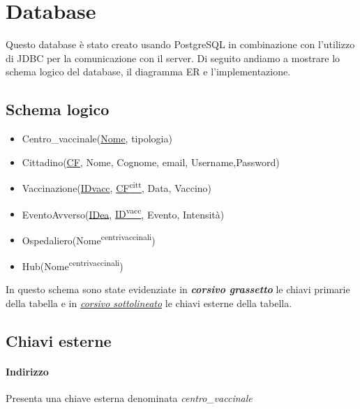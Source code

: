 \section{Database}

	Questo database è stato creato usando PostgreSQL in combinazione con l’utilizzo di JDBC per la comunicazione con il server.
	Di seguito andiamo a mostrare lo schema logico del database, il diagramma ER e l’implementazione.
	
\subsection{Schema logico}

	\begin{itemize}
		\item Centro\_vaccinale(\underline{Nome}, tipologia)
		
		\item Cittadino(\underline{CF}, Nome, Cognome, email, Username,Password)
		
		\item Vaccinazione(\underline{IDvacc}, \underline{CF\textsuperscript{citt}}, Data, Vaccino)
		
		\item EventoAvverso(\underline{IDea}, \underline{ID\textsuperscript{vacc}}, Evento, Intensità)
		
		\item Ospedaliero(Nome\textsuperscript{centrivaccinali})
		
		\item Hub(Nome\textsuperscript{centrivaccinali})
	\end{itemize}
	
	In questo schema sono state evidenziate in \textbf{\textit{corsivo grassetto}} le chiavi primarie della tabella e in \underline{\textit{corsivo sottolineato}} le chiavi esterne della tabella.
	
\subsection{Chiavi esterne}
	
	\paragraph{Indirizzo}
	Presenta una chiave esterna denominata \emph{centro\_vaccinale} 
